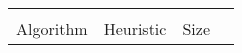 \begin{tabular}{lllr}
\toprule
   &     &          \\
Algorithm & Heuristic & Size \\
\bottomrule
\end{tabular}
